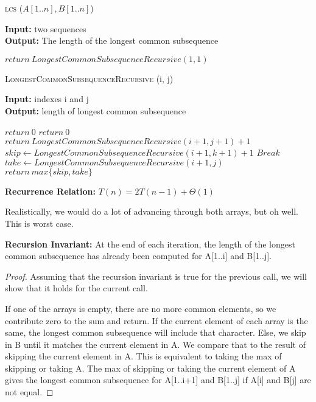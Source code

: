 \documentclass{article}
\begin{document}
\begin{algorithm} \caption{\textsc{lcs} ($A[1..n], B[1..n]$)}\label{alg:seb}
    {\bf Input:} two sequences\\
    {\bf Output:} The length of the longest common subsequence
    \begin{algorithmic}[1]
        \State$return\ LongestCommonSubsequenceRecursive(1, 1)$
    \end{algorithmic}
\end{algorithm}

\begin{algorithm} \caption{\textsc{LongestCommonSubsequenceRecursive} (i, j)}\label{alg:seb}
    {\bf Input:} indexes i and j\\
    {\bf Output:} length of longest common subsequence
    \begin{algorithmic}[1]
            \State$return\ 0$
            \State$return\ 0$
            \State$return\ LongestCommonSubsequenceRecursive(i+1, j+1) +1$
        \Else{}
                    \State$skip \gets LongestCommonSubsequenceRecursive(i+1, k+1) +1$
                    \State$Break$
                \EndIf{}
            \EndFor{}
            \State$take \gets LongestCommonSubsequenceRecursive(i+1, j)$
            \State$return\ max\{skip, take\}$
        \EndIf{}
    \end{algorithmic}
\end{algorithm}

{\bf Recurrence Relation: } $T(n) = 2T(n-1) + \Theta(1)$

Realistically, we would do a lot of advancing through both arrays, but oh well. This is worst case.

{\bf Recursion Invariant:} At the end of each iteration, the length of the longest common subsequence has already been computed for A[1..i] and B[1..j].

\begin{proof}
    Assuming that the recursion invariant is true for the previous call, we will show that it holds for the current call.

    If one of the arrays is empty, there are no more common elements, so we contribute zero to the sum and return.
    If the current element of each array is the same, the longest common subsequence will include that character.
    Else, we skip in B until it matches the current element in A. We compare that to the result of skipping the current
    element in A. This is equivalent to taking the max of skipping or taking A. The max of skipping or taking the
    current element of A gives the longest common subsequence for A[1..i+1] and B[1..j] if A[i] and B[j] are not equal.

\end{proof}
\end{document}
